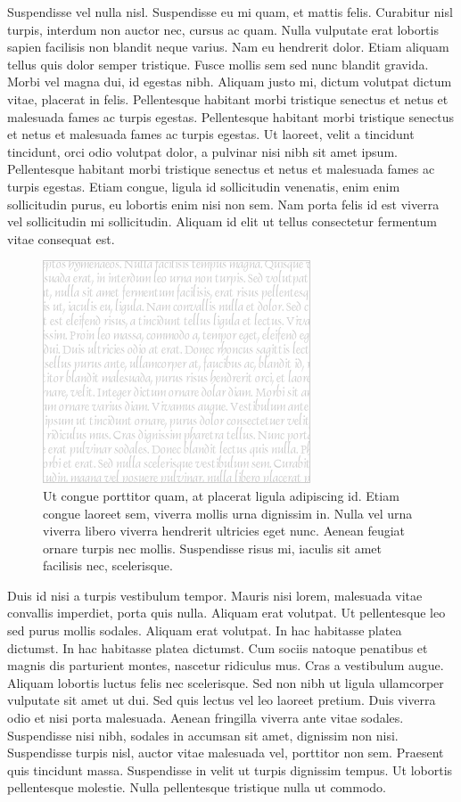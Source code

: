 Suspendisse vel nulla nisl.
Suspendisse eu mi quam, et mattis felis.
Curabitur nisl turpis, interdum non auctor nec, cursus ac quam.
Nulla vulputate erat lobortis sapien facilisis non blandit neque varius.
Nam eu hendrerit dolor.
Etiam aliquam tellus quis dolor semper tristique.
Fusce mollis sem sed nunc blandit gravida.
Morbi vel magna dui, id egestas nibh.
Aliquam justo mi, dictum volutpat dictum vitae, placerat in felis.
Pellentesque habitant morbi tristique senectus et netus et malesuada fames ac turpis egestas.
Pellentesque habitant morbi tristique senectus et netus et malesuada fames ac turpis egestas.
Ut laoreet, velit a tincidunt tincidunt, orci odio volutpat dolor, a pulvinar nisi nibh sit amet ipsum.
Pellentesque habitant morbi tristique senectus et netus et malesuada fames ac turpis egestas.
Etiam congue, ligula id sollicitudin venenatis, enim enim sollicitudin purus, eu lobortis enim nisi non sem.
Nam porta felis id est viverra vel sollicitudin mi sollicitudin.
Aliquam id elit ut tellus consectetur fermentum vitae consequat est.

\begin{figure}
  \centering
  \includegraphics{figs/medium-rectangle-white}
  \caption[Ut conque porritor quam]{
    Ut congue porttitor quam, at placerat ligula adipiscing id.
Etiam congue laoreet sem, viverra mollis urna dignissim in.
Nulla vel urna viverra libero viverra hendrerit ultricies eget nunc.
Aenean feugiat ornare turpis nec mollis.
Suspendisse risus mi, iaculis sit amet facilisis nec, scelerisque.
  }
\end{figure}

Duis id nisi a turpis vestibulum tempor.
Mauris nisi lorem, malesuada vitae convallis imperdiet, porta quis nulla.
Aliquam erat volutpat.
Ut pellentesque leo sed purus mollis sodales.
Aliquam erat volutpat.
In hac habitasse platea dictumst.
In hac habitasse platea dictumst.
Cum sociis natoque penatibus et magnis dis parturient montes, nascetur ridiculus mus.
Cras a vestibulum augue.
Aliquam lobortis luctus felis nec scelerisque.
Sed non nibh ut ligula ullamcorper vulputate sit amet ut dui.
Sed quis lectus vel leo laoreet pretium.
Duis viverra odio et nisi porta malesuada.
Aenean fringilla viverra ante vitae sodales.
Suspendisse nisi nibh, sodales in accumsan sit amet, dignissim non nisi.
Suspendisse turpis nisl, auctor vitae malesuada vel, porttitor non sem.
Praesent quis tincidunt massa.
Suspendisse in velit ut turpis dignissim tempus.
Ut lobortis pellentesque molestie.
Nulla pellentesque tristique nulla ut commodo.

